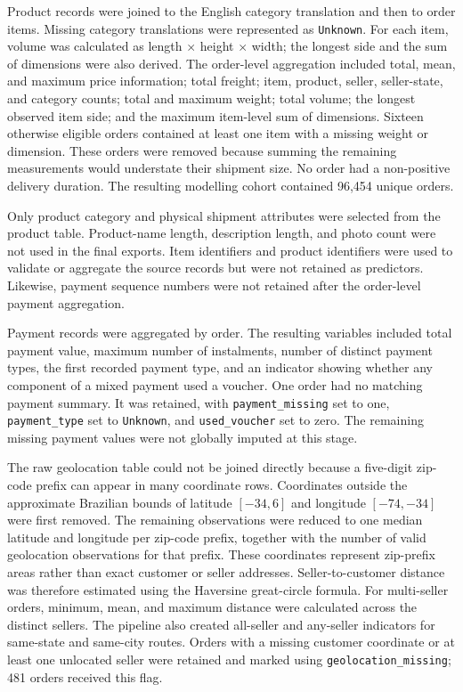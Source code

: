 Product records were joined to the English category translation and then to order items. Missing category translations were represented as \texttt{Unknown}. For each item, volume was calculated as length $\times$ height $\times$ width; the longest side and the sum of dimensions were also derived. The order-level aggregation included total, mean, and maximum price information; total freight; item, product, seller, seller-state, and category counts; total and maximum weight; total volume; the longest observed item side; and the maximum item-level sum of dimensions. Sixteen otherwise eligible orders contained at least one item with a missing weight or dimension. These orders were removed because summing the remaining measurements would understate their shipment size. No order had a non-positive delivery duration. The resulting modelling cohort contained 96,454 unique orders.

Only product category and physical shipment attributes were selected from the product table. Product-name length, description length, and photo count were not used in the final exports. Item identifiers and product identifiers were used to validate or aggregate the source records but were not retained as predictors. Likewise, payment sequence numbers were not retained after the order-level payment aggregation.

Payment records were aggregated by order. The resulting variables included total payment value, maximum number of instalments, number of distinct payment types, the first recorded payment type, and an indicator showing whether any component of a mixed payment used a voucher. One order had no matching payment summary. It was retained, with \texttt{payment\_missing} set to one, \texttt{payment\_type} set to \texttt{Unknown}, and \texttt{used\_voucher} set to zero. The remaining missing payment values were not globally imputed at this stage.

The raw geolocation table could not be joined directly because a five-digit zip-code prefix can appear in many coordinate rows. Coordinates outside the approximate Brazilian bounds of latitude $[-34,6]$ and longitude $[-74,-34]$ were first removed. The remaining observations were reduced to one median latitude and longitude per zip-code prefix, together with the number of valid geolocation observations for that prefix. These coordinates represent zip-prefix areas rather than exact customer or seller addresses. Seller-to-customer distance was therefore estimated using the Haversine great-circle formula. For multi-seller orders, minimum, mean, and maximum distance were calculated across the distinct sellers. The pipeline also created all-seller and any-seller indicators for same-state and same-city routes. Orders with a missing customer coordinate or at least one unlocated seller were retained and marked using \texttt{geolocation\_missing}; 481 orders received this flag.

